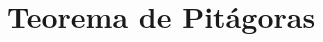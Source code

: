 \documentclass[12pt,addpoints]{repaso}
\begin{document}
\begin{questions}
{\begin{multicols}{3}
        \end{multicols}
    }


    \section*{Teorema de Pitágoras}



\end{questions}
\end{document}
